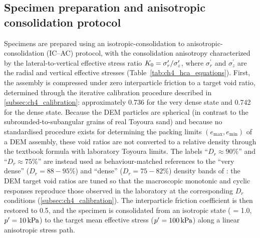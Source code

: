 \documentclass[../main]{subfiles}
\begin{document}
\subsection{Specimen preparation and anisotropic consolidation protocol}
\label{subsec:ch4_preparation}

Specimens are prepared using an isotropic-consolidation to anisotropic-consolidation (IC--AC) protocol, with the consolidation anisotropy characterized by the lateral-to-vertical effective stress ratio $K_0 = \sigma_r^{\prime}/\sigma_z^{\prime}$, where $\sigma_r^{\prime}$ and $\sigma_z^{\prime}$ are the radial and vertical effective stresses (Table~\ref{tab:ch4_hca_equations}). First, the assembly is compressed under zero interparticle friction to a target void ratio, determined through the iterative calibration procedure described in \cref{subsec:ch4_calibration}: approximately 0.736 for the very dense state and 0.742 for the dense state. Because the DEM particles are spherical (in contrast to the subrounded-to-subangular grains of real Toyoura sand) and because no standardised procedure exists for determining the packing limits $(e_{\max}, e_{\min})$ of a DEM assembly, these void ratios are not converted to a relative density through the textbook formula with laboratory Toyoura limits. The labels ``$D_r \approx 90\%$'' and ``$D_r \approx 75\%$'' are instead used as behaviour-matched references to the ``very dense'' ($D_r = 88\!-\!95\%$) and ``dense'' ($D_r = 75\!-\!82\%$) density bands of \citet{Ishihara1985}: the DEM target void ratios are tuned so that the macroscopic monotonic and cyclic responses reproduce those observed in the laboratory at the corresponding $D_r$ conditions (\cref{subsec:ch4_calibration}). The interparticle friction coefficient is then restored to 0.5, and the specimen is consolidated from an isotropic state (\Kzero{} = 1.0, $p'=\SI{10}{kPa}$) to the target mean effective stress ($p'=\SI{100}{kPa}$) along a linear anisotropic stress path.
\end{document}
